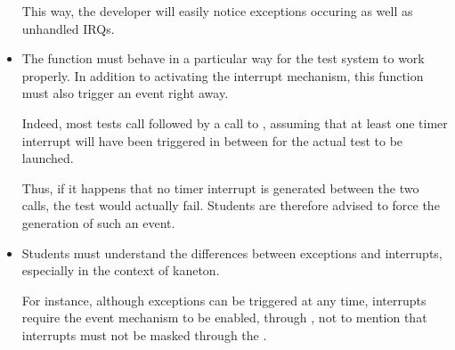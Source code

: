 \begin{itemize}
    This way, the developer will easily notice exceptions occuring as well
    as unhandled IRQs.
  \item
    The  function must behave in a particular way
    for the test system to work properly. In addition to activating the
    interrupt mechanism, this function must also trigger an event
    right away.

    \-

    Indeed, most tests call  followed by a call
    to , assuming that at least one timer interrupt
    will have been triggered in between for the actual test to be
    launched.

    \-

    Thus, if it happens that no timer interrupt is generated between
    the two calls, the test would actually fail. Students are therefore
    advised to force the generation of such an event.
  \item
    Students must understand the differences between exceptions and
    interrupts, especially in the context of kaneton.

    \-

    For instance, although exceptions can be triggered at any time,
    interrupts require the event mechanism to be enabled, through
    , not to mention that interrupts must
    not be masked through the .
\end{itemize}
